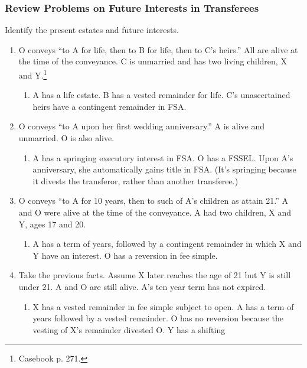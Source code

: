 \subsubsection{Review Problems on Future Interests in Transferees}

Identify the present estates and future interests.

\begin{enumerate}
    \item O conveys ``to A for life, then to B for life, then to C's 
    heirs.'' All are alive at the time of the conveyance. C is unmarried and 
    has two living children, X and Y.\footnote{Casebook p. 271.}
    \begin{enumerate}
        \item A has a life estate. B has a vested remainder for life. C's 
        unascertained heirs have a contingent remainder in FSA.
    \end{enumerate}
    \item O conveys ``to A upon her first wedding anniversary.'' A is alive 
    and unmarried. O is also alive.
    \begin{enumerate}
        \item A has a springing executory interest in FSA. O has a FSSEL. Upon 
        A's anniversary, she automatically gains title in FSA. (It's springing 
        because it divests the transferor, rather than another transferee.)
    \end{enumerate}
    \item O conveys ``to A for 10 years, then to such of A's children as 
    attain 21.'' A and O were alive at the time of the conveyance. A had two 
    children, X and Y, ages 17 and 20.
    \begin{enumerate}
        \item A has a term of years, followed by a contingent remainder in 
        which X and Y have an interest. O has a reversion in fee simple.
    \end{enumerate}
    \item Take the previous facts. Assume X later reaches the age of 21 but Y 
    is still under 21. A and O are still alive. A's ten year term has not 
    expired.
    \begin{enumerate}
        \item X has a vested remainder in fee simple subject to open. A has a 
        term of years followed by a vested remainder. O has no reversion 
        because the vesting of X's remainder divested O. Y has a shifting 

\end{enumerate}
\end{enumerate}
